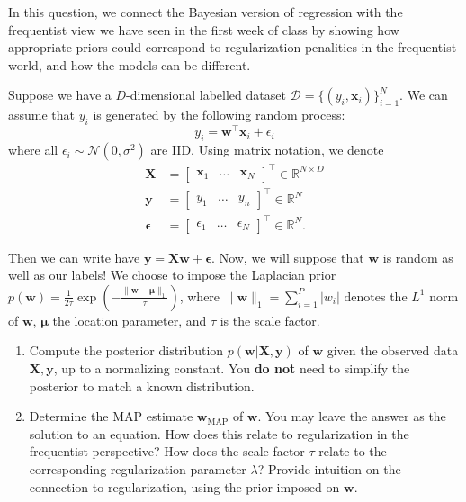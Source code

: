 \documentclass[submit]{harvardml}
\begin{document}
\begin{problem}
    In this question, we connect the Bayesian version of regression with the frequentist view we have seen in the first week of class by showing how appropriate priors could correspond to regularization penalities in the frequentist world, and how the models can be different.
    
    Suppose we have a $D$-dimensional labelled dataset $\mathcal{D} = \{(y_i, \mathbf{x}_i)\}_{i=1}^N$. We can assume that $y_i$ is generated by the following random process: $$y_i = \mathbf{w}^\top\mathbf{x}_i + \epsilon_i$$ where all $\epsilon_i \sim \mathcal{N}(0,\sigma^2)$ are IID. Using matrix notation, we denote
    \begin{align*}
      \mathbf{X} &= \begin{bmatrix}\mathbf{x}_1 & \ldots & \mathbf{x}_N\end{bmatrix}^\top \in \mathbb{R}^{N \times D} \\
      \mathbf{y} &= \begin{bmatrix} y_1 & \dots & y_n \end{bmatrix}^\top  \in \mathbb{R}^N \\
      \mathbf{\epsilon} &= \begin{bmatrix} \epsilon_1 & \dots & \epsilon_N \end{bmatrix}^\top \in \mathbb{R}^N.
    \end{align*}
    
    Then we can write have $\mathbf{y} = \mathbf{X}\mathbf{w} + \mathbf{\epsilon}$. Now, we will suppose that $\mathbf{w}$ is random as well as our labels! We choose to impose the Laplacian prior $p(\mathbf{w})=\frac{1}{2\tau}\exp\left(-\frac{\|\mathbf{w}-\mathbf{\mu}\|_1}{\tau}\right)$, where $\|\mathbf{w}\|_1=\sum_{i=1}^P |w_i|$ denotes the $L^1$ norm of $\mathbf{w}$, $\mathbf{\mu}$ the location parameter, and $\tau$ is the scale factor.
    
    \begin{enumerate}
    
        \item Compute the posterior distribution $p(\mathbf{w}|\mathbf{X}, \mathbf{y})$ of $\mathbf{w}$ given the observed data $\mathbf{X}, \mathbf{y}$, up to a normalizing constant. You \textbf{do not} need to simplify the posterior to match a known distribution.
        
        \item Determine the MAP estimate $\mathbf{w}_{\mathrm{MAP}}$ of $\mathbf{w}$. You may leave the answer as the solution to an equation. How does this relate to regularization in the frequentist perspective? How does the scale factor $\tau$ relate to the corresponding regularization parameter $\lambda$? Provide intuition on the connection to regularization, using the prior imposed on $\mathbf{w}$.
        

\end{enumerate}
\end{problem}
\end{document}
